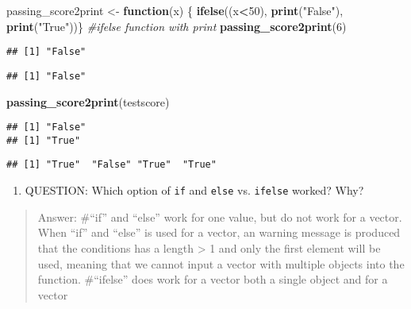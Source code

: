 \documentclass[]{article}
\newenvironment{Shaded}{\begin{snugshade}}{\end{snugshade}}
\newcommand{\CommentTok}[1]{\textcolor[rgb]{0.56,0.35,0.01}{\textit{#1}}}
\newcommand{\ControlFlowTok}[1]{\textcolor[rgb]{0.13,0.29,0.53}{\textbf{#1}}}
\newcommand{\DecValTok}[1]{\textcolor[rgb]{0.00,0.00,0.81}{#1}}
\newcommand{\KeywordTok}[1]{\textcolor[rgb]{0.13,0.29,0.53}{\textbf{#1}}}
\newcommand{\NormalTok}[1]{#1}
\newcommand{\OperatorTok}[1]{\textcolor[rgb]{0.81,0.36,0.00}{\textbf{#1}}}
\newcommand{\StringTok}[1]{\textcolor[rgb]{0.31,0.60,0.02}{#1}}
\providecommand{\tightlist}{%
  \setlength{\itemsep}{0pt}\setlength{\parskip}{0pt}}
\begin{document}
\begin{Shaded}
\begin{Highlighting}[]
\NormalTok{passing_score2print <-}\StringTok{ }\ControlFlowTok{function}\NormalTok{(x) \{}
  \KeywordTok{ifelse}\NormalTok{((x}\OperatorTok{<}\DecValTok{50}\NormalTok{), }
         \KeywordTok{print}\NormalTok{(}\StringTok{"False"}\NormalTok{), }\KeywordTok{print}\NormalTok{(}\StringTok{"True"}\NormalTok{))\} }\CommentTok{#ifelse function with print }
\KeywordTok{passing_score2print}\NormalTok{(}\DecValTok{6}\NormalTok{)}
\end{Highlighting}
\end{Shaded}

\begin{verbatim}
## [1] "False"
\end{verbatim}

\begin{verbatim}
## [1] "False"
\end{verbatim}

\begin{Shaded}
\begin{Highlighting}[]
\KeywordTok{passing_score2print}\NormalTok{(testscore)}
\end{Highlighting}
\end{Shaded}

\begin{verbatim}
## [1] "False"
## [1] "True"
\end{verbatim}

\begin{verbatim}
## [1] "True"  "False" "True"  "True"
\end{verbatim}

\begin{enumerate}
\def\labelenumi{\arabic{enumi}.}
\setcounter{enumi}{11}
\tightlist
\item
  QUESTION: Which option of \texttt{if} and \texttt{else} vs.
  \texttt{ifelse} worked? Why?
\end{enumerate}

\begin{quote}
Answer: \#``if'' and ``else'' work for one value, but do not work for a
vector. When ``if'' and ``else'' is used for a vector, an warning
message is produced that the conditions has a length \textgreater{} 1
and only the first element will be used, meaning that we cannot input a
vector with multiple objects into the function. \#``ifelse'' does work
for a vector both a single object and for a vector
\end{quote}
\end{document}
